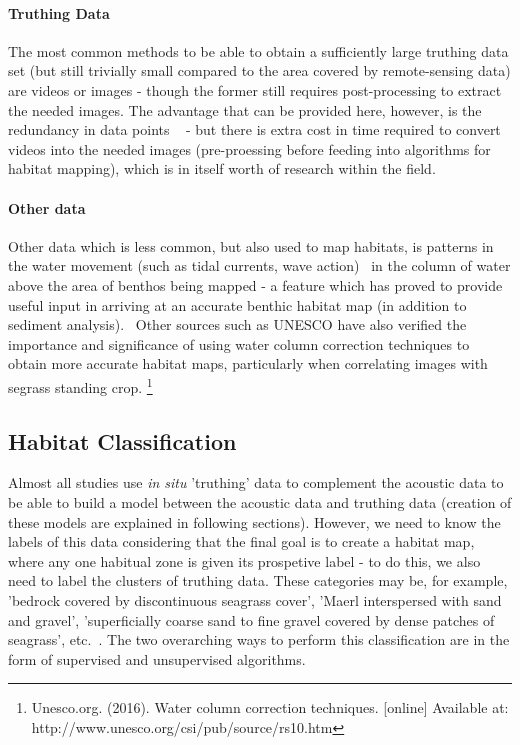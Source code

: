 \documentclass[12pt]{article}
\begin{document}
            \paragraph{Truthing Data}
            The most common methods to be able to obtain a sufficiently large truthing data set (but still trivially small compared to the area covered by remote-sensing data) are videos or images - though the former still requires post-processing to extract the needed images. The advantage that can be provided here, however, is the redundancy in data points ~\citep*{rattray14}  - but there is extra cost in time required to convert videos into the needed images (pre-proessing before feeding into algorithms for habitat mapping), which is in itself worth of research within the field.~\citep*{lucieer13}

            \paragraph{Other data}
            Other data which is less common, but also used to map habitats, is patterns in the water movement (such as tidal currents, wave action)~\citep*{cjbrown11} in the column of water above the area of benthos being mapped - a feature which has proved to provide useful input in arriving at an accurate benthic habitat map (in addition to sediment analysis).~\citep*{snelgrove94} Other sources such as UNESCO have also verified the importance and significance of using water column correction techniques to obtain more accurate habitat maps, particularly when correlating images with segrass standing crop. \footnote{Unesco.org. (2016). Water column correction techniques. [online] Available at: http://www.unesco.org/csi/pub/source/rs10.htm} 

            \subsection{Habitat Classification}

            Almost all studies use \textit{in situ} 'truthing' data to complement the acoustic data to be able to build a model between the acoustic data and truthing data (creation of these models are explained in following sections). However, we need to know the labels of this data considering that the final goal is to create a habitat map, where any one habitual zone is given its prospetive label - to do this, we also need to label the clusters of truthing data. These categories may be, for example, 'bedrock covered by discontinuous seagrass cover', 'Maerl interspersed with sand and gravel', 'superficially coarse sand to fine gravel covered by dense patches of seagrass', etc.~\citep{micallef12}. The two overarching ways to perform this classification are in the form of supervised and unsupervised algorithms.
\end{document}
